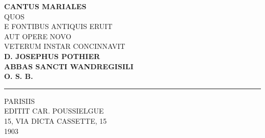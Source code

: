 \begin{center}
\Huge{\bf CANTUS MARIALES}\\
\vspace{20pt}
\large{QUOS}\\
\vspace{20pt}
\large{E FONTIBUS ANTIQUIS ERUIT}\\
\vspace{20pt}
\large{AUT OPERE NOVO}\\
\vspace{20pt}
\large{VETERUM INSTAR CONCINNAVIT}\\
\vspace{20pt}
\huge{\bf D. JOSEPHUS POTHIER}\\
\vspace{20pt}
\large{\bf ABBAS SANCTI WANDREGISILI}\\
\vspace{20pt}
\large{\bf O. S. B.}
\end{center}

\rule{1in}{1pt}
\vfil
\begin{center}
PARISIIS\\
\vspace{10pt}
EDITIT CAR. POUSSIELGUE\\
\vspace{10pt}
15, VIA DICTA CASSETTE, 15\\
\vspace{10pt}
1903
\end{center}
